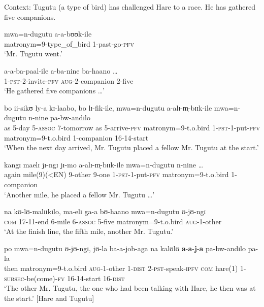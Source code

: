 \begin{exe}
\ex \label{exSubsecutiveHareTugutu}
Context: Tugutu (a type of bird) has challenged Hare to a race. He has gathered five companions.
\begin{xlist}

\ex \gll mwa=n-dugutu a-a-bʊʊk-ile\\
matronym=9-type\_of\_bird 1-past-go-\textsc{pfv}\\
\glt \lq Mr. Tugutu went.'

\ex \gll a-a-ba-paal-ile a-ba-nine ba-haano \ldots\\
1-\textsc{pst}-2-invite-\textsc{pfv} \textsc{aug}-2-companion 2-five {}\\
\glt \lq He gathered five companions \ldots'


\ex \label{exSubsecutiveHareTugutuSentence3} \gll bo ii-sikʊ ly-a kɪ-laabo, bo lɪ-fik-ile, mwa=n-dugutu a-alɪ-m̩-bɪɪk-ile mwa=n-dugutu n-nine pa-bw-andɪlo\\
as 5-day 5-\textsc{assoc} 7-tomorrow as 5-arrive-\textsc{pfv} matronym=9-t.o.bird 1-\textsc{pst}-1-put-\textsc{pfv} matronym=9-t.o.bird 1-companion 16-14-start\\
\glt \lq When the next day arrived, Mr. Tugutu placed a fellow Mr. Tugutu at the start.'

\ex \label{exSubsecutiveHareTugutuSentence4} \gll kangɪ maelɪ jɪ-ngɪ jɪ-mo a-alɪ-m̩-bɪɪk-ile mwa=n-dugutu n-nine \ldots\\
again mile(9)(<EN) 9-other 9-one 1-\textsc{pst}-1-put-\textsc{pfv} matronym=9-t.o.bird 1-companion {}\\
\glt \lq Another mile, he placed a fellow Mr. Tugutu \ldots'

\ex \label{exSubsecutiveHareTugutuSentence5} \gll na kʊ-lʊ-malɪɪkɪlo, ma-elɪ ga-a bʊ-haano mwa=n-dugutu ʊ-jʊ-ngɪ\\
\textsc{com} 17-11-end 6-mile 6-\textsc{assoc} 5-five matronym=9-t.o.bird \textsc{aug}-1-other\\
\glt \lq At the finish line, the fifth mile, another Mr. Tugutu.'

\ex \label{exSubsecutiveHareTugutuSentence6} \gll po mwa=n-dugutu ʊ-jʊ-ngɪ, jʊ-la ba-a-job-aga na kalʊlʊ \textbf{a}-\textbf{a}-\textbf{j}-\textbf{a} pa-bw-andɪlo pa-la\\
then matronym=9-t.o.bird \textsc{aug}-1-other 1-\textsc{dist} 2-\textsc{pst}-speak-\textsc{ipfv} \textsc{com} hare(1) 1-\textsc{subsec}-be(come)-\textsc{fv} 16-14-start 16-\textsc{dist}\\
\glt \lq  ‎‎The other Mr. Tugutu, the one who had been talking with Hare, he then was at the start.' [Hare and Tugutu]
\end{xlist}
\end{exe}%

